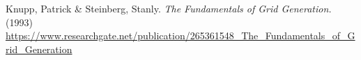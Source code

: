 \documentclass[11pt, a4paper]{article} %
\begin{document}
\begin{thebibliography}{1}
Knupp, Patrick \& Steinberg, Stanly. {\em The Fundamentals of Grid Generation.} (1993) \href{https://www.researchgate.net/publication/265361548_The_Fundamentals_of_Grid_Generation}{https://www.researchgate.net/publication/265361548\_The\_Fundamentals\_of\_Grid\_Generation} 


	
\end{thebibliography}
\end{document}
